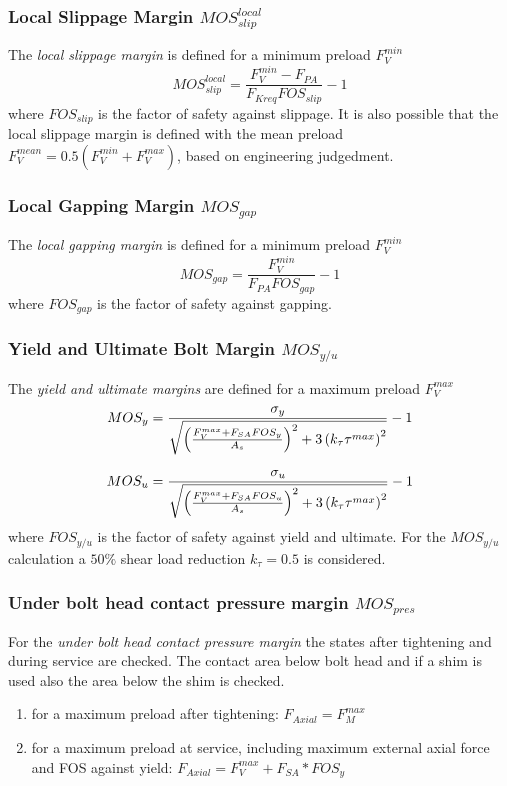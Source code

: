 \subsubsection{Local Slippage Margin $MOS_{slip}^{local}$}
The \emph{local slippage margin} is defined for a minimum preload $F_V^{min}$
\begin{equation}
  MOS_{slip}^{local} = \frac{F_V^{min}-F_{PA}}{F_{Kreq} FOS_{slip}}-1
\end{equation}
where $FOS_{slip}$ is the factor of safety against slippage. It is also possible that the local slippage 
margin is defined with the mean preload $F_V^{mean} = 0.5 (F_V^{min}+F_V^{max})$, based on engineering
judgedment. 
\subsubsection{Local Gapping Margin $MOS_{gap}$}
The \emph{local gapping margin} is defined for a minimum preload $F_V^{min}$
\begin{equation}
  MOS_{gap} = \frac{F_V^{min}}{F_{PA} FOS_{gap}}-1
\end{equation}
where $FOS_{gap}$ is the factor of safety against gapping. 
\subsubsection{Yield and Ultimate Bolt Margin $MOS_{y/u}$}
The \emph{yield and ultimate margins} are defined for a maximum preload $F_V^{max}$ 
\begin{subequations}
  \setlength{\jot}{10pt}
  \begin{align}
    MOS_{y} &= \frac{\sigma_y}{\sqrt{\left(\frac{F_V^{max}+F_{SA} FOS_y}{A_s}\right)^2 + 
      3\left(k_{\tau} \tau^{max}\right)^2}}-1 \\
    MOS_{u} &= \frac{\sigma_u}{\sqrt{\left(\frac{F_V^{max}+F_{SA} FOS_u}{A_s}\right)^2 + 
      3\left(k_{\tau} \tau^{max}\right)^2}}-1
  \end{align}
\end{subequations}
where $FOS_{y/u}$ is the factor of safety against yield and ultimate. For the $MOS_{y/u}$ calculation
a $50\%$ shear load reduction $k_{\tau} = 0.5$ is considered\footnotemark[2]
.
\subsubsection{Under bolt head contact pressure margin $MOS_{pres}$}
For the \emph{under bolt head contact pressure margin} the states after tightening and during service
are checked. The contact area below bolt head and if a shim is used also the area below the shim is checked. 
\begin{enumerate}
  \item for a maximum preload after tightening: $F_{Axial} = F_M^{max}$
  \item for a maximum preload at service, including maximum external axial force and FOS against yield:
  $F_{Axial} = F_V^{max}+F_{SA}*FOS_y$
\end{enumerate}
